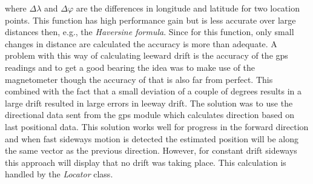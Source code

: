 where $\Delta\lambda$ and $\Delta\varphi$ are the differences in longitude and latitude for two location points. This function has high performance gain but is less accurate over large distances then, e.g., the \emph{Haversine formula}\cite{haversine}. Since for this function, only small changes in distance are calculated the accuracy is more than adequate. A problem with this way of calculating leeward drift is the accuracy of the \gls{gps} readings and to get a good bearing the idea was to make use of the magnetometer though the accuracy of that is also far from perfect. This combined with the fact that a small deviation of a couple of degrees results in a large drift resulted in large errors in leeway drift. The solution was to use the directional data sent from the \gls{gps} module which calculates direction based on last positional data. This solution works well for progress in the forward direction and when fast sideways motion is detected the estimated position will be along the same vector as the previous direction. However, for constant drift sideways this approach will display that no drift was taking place. This calculation is handled by the \emph{Locator} class.

























